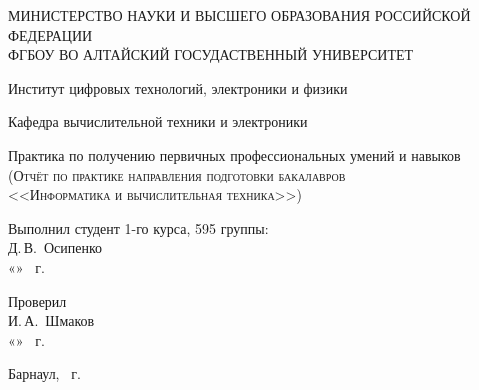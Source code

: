 \documentclass[a4paper,14pt]{extarticle}
\begin{document}
\begin{titlepage}
  \begin{center}
    \MakeUppercase{Министерство науки и высшего образования Российской Федерации} \\
    \MakeUppercase{ФГБОУ ВО Алтайский госудаственный университет}
    \vspace{0.25cm}
    
    Институт цифровых технологий, электроники и физики
    
    Кафедра вычислительной техники и электроники
    \vfill
    
    {\LARGE Практика по получению первичных профессиональных умений и навыков}\\[5mm]
    \textsc{(Отчёт по практике направления подготовки бакалавров \\<<Информатика и вычислительная техника>>)}
  \bigskip

\end{center}
\vfill

\newlength{\ML}
\hfill\begin{minipage}{0.4\textwidth}
  Выполнил студент 1-го курса, 595 группы:\\
  \underline{\hspace{\ML}} Д.\,В.~Осипенко\\
  «\underline{\hspace{0.7cm}}» \underline{\hspace{2cm}} \the\year~г.
\end{minipage}%
\bigskip

\hfill\begin{minipage}{0.4\textwidth}
  Проверил\\
  \underline{\hspace{\ML}} И.\,А.~Шмаков\\
  «\underline{\hspace{0.7cm}}» \underline{\hspace{2cm}} \the\year~г.
\end{minipage}%
\vfill

\begin{center}
  Барнаул, \the\year~г.
\end{center}
\end{titlepage}

\tableofcontents

\newpage
\end{document}
